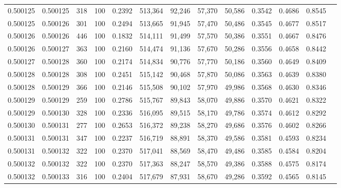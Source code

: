 \begin{tabular}{rrrrrrrrrrrrr}
0.500125 & 0.500125 &   318 & 100 &                                     0.2392 & 513,364 &  92,246 &  57,370 &  50,586 & 0.3542 & 0.4686 & 0.8545 \\
0.500125 & 0.500126 &   301 & 100 &                                     0.2494 & 513,665 &  91,945 &  57,470 &  50,486 & 0.3545 & 0.4677 & 0.8517 \\
0.500126 & 0.500126 &   446 & 100 &                                     0.1832 & 514,111 &  91,499 &  57,570 &  50,386 & 0.3551 & 0.4667 & 0.8476 \\
0.500126 & 0.500127 &   363 & 100 &                                     0.2160 & 514,474 &  91,136 &  57,670 &  50,286 & 0.3556 & 0.4658 & 0.8442 \\
0.500127 & 0.500128 &   360 & 100 &                                     0.2174 & 514,834 &  90,776 &  57,770 &  50,186 & 0.3560 & 0.4649 & 0.8409 \\
0.500128 & 0.500128 &   308 & 100 &                                     0.2451 & 515,142 &  90,468 &  57,870 &  50,086 & 0.3563 & 0.4639 & 0.8380 \\
0.500128 & 0.500129 &   366 & 100 &                                     0.2146 & 515,508 &  90,102 &  57,970 &  49,986 & 0.3568 & 0.4630 & 0.8346 \\
0.500129 & 0.500129 &   259 & 100 &                                     0.2786 & 515,767 &  89,843 &  58,070 &  49,886 & 0.3570 & 0.4621 & 0.8322 \\
0.500129 & 0.500130 &   328 & 100 &                                     0.2336 & 516,095 &  89,515 &  58,170 &  49,786 & 0.3574 & 0.4612 & 0.8292 \\
0.500130 & 0.500131 &   277 & 100 &                                     0.2653 & 516,372 &  89,238 &  58,270 &  49,686 & 0.3576 & 0.4602 & 0.8266 \\
0.500131 & 0.500131 &   347 & 100 &                                     0.2237 & 516,719 &  88,891 &  58,370 &  49,586 & 0.3581 & 0.4593 & 0.8234 \\
0.500131 & 0.500132 &   322 & 100 &                                     0.2370 & 517,041 &  88,569 &  58,470 &  49,486 & 0.3585 & 0.4584 & 0.8204 \\
0.500132 & 0.500132 &   322 & 100 &                                     0.2370 & 517,363 &  88,247 &  58,570 &  49,386 & 0.3588 & 0.4575 & 0.8174 \\
0.500132 & 0.500133 &   316 & 100 &                                     0.2404 & 517,679 &  87,931 &  58,670 &  49,286 & 0.3592 & 0.4565 & 0.8145 \\

\end{tabular}
